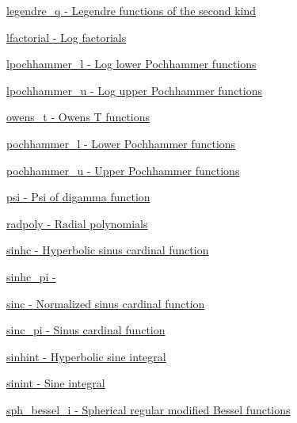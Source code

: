 \begin{DoxyItemize}
\item \hyperlink{group__gnu__math__spec__func_gac0bb3b5a3229e7b7f80982785ff8f477}{legendre\+\_\+q -\/ Legendre functions of the second kind}
\item \hyperlink{group__gnu__math__spec__func_ga17b1dc664e1ab95213c340f2453b09e3}{lfactorial -\/ Log factorials}
\item \hyperlink{group__gnu__math__spec__func_ga5a60fbbf559aa86dfe918d9ef23e8a74}{lpochhammer\+\_\+l -\/ Log lower Pochhammer functions}
\item \hyperlink{group__gnu__math__spec__func_ga85e5565a30599065b8ccbc499c5d0d85}{lpochhammer\+\_\+u -\/ Log upper Pochhammer functions}
\item \hyperlink{group__gnu__math__spec__func_ga7a52e8d5df5b110810c4bdba78a9d2ae}{owens\+\_\+t -\/ Owens T functions}
\item \hyperlink{group__gnu__math__spec__func_gafed029416c3c440fea35a3a135991436}{pochhammer\+\_\+l -\/ Lower Pochhammer functions}
\item \hyperlink{group__gnu__math__spec__func_ga4cadb141501737e85c8d6511fe3d3b94}{pochhammer\+\_\+u -\/ Upper Pochhammer functions}
\item \hyperlink{group__gnu__math__spec__func_ga850cdad2e428a553e5adf2474a6a385a}{psi -\/ Psi of digamma function}
\item \hyperlink{group__gnu__math__spec__func_ga2a415dff236d6e4c36150bd5958eaf78}{radpoly -\/ Radial polynomials}
\item \hyperlink{group__gnu__math__spec__func_gad6975a69b8e40a6237b4124b459c6181}{sinhc -\/ Hyperbolic sinus cardinal function}
\item \hyperlink{group__gnu__math__spec__func_ga59ba25b4276fea8c628629420b522b15}{sinhc\+\_\+pi -\/ }
\item \hyperlink{group__gnu__math__spec__func_gab0697cae10f8981fa700ab81c67a7746}{sinc -\/ Normalized sinus cardinal function}
\item \hyperlink{group__gnu__math__spec__func_gacfca76a0549d5c42394e1597f83414da}{sinc\+\_\+pi -\/ Sinus cardinal function}
\item \hyperlink{group__gnu__math__spec__func_ga19941fbce9fb8e097eb757761f9326db}{sinhint -\/ Hyperbolic sine integral}
\item \hyperlink{group__gnu__math__spec__func_ga4b0807985bd194392fc7d7abe4cf2c61}{sinint -\/ Sine integral}
\item \hyperlink{group__gnu__math__spec__func_ga93454a071a189f7cc9e79078526aa3fd}{sph\+\_\+bessel\+\_\+i -\/ Spherical regular modified Bessel functions}

\end{DoxyItemize}
